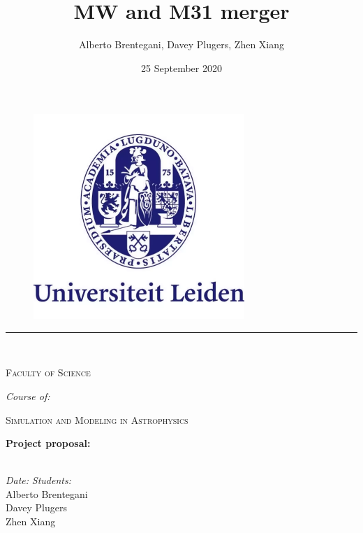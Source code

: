 \documentclass[11pt, english]{article}
\title{MW and M31 merger}
\author{Alberto Brentegani, Davey Plugers, Zhen Xiang}
\date{25 September 2020}
\begin{document}
\begin{titlepage}
\makeatletter
\begin{center}

\vspace*{-1in}
\begin{figure}[htb]
    \centering
    \includegraphics[width=8cm]{lu_logo.png}
\end{figure}

\vspace{-25pt}
\rule{125mm}{0.1mm} \\
\vspace{5pt}
\begin{Large}
    \textsc{Faculty of Science}\\
\end{Large}
\vspace{5pt}
\textit{Course of:}\\

\begin{Large}
    \textsc{Simulation and Modeling in Astrophysics}\\
\end{Large}
\vspace{30pt}

\begin{LARGE}
    \textbf{Project proposal:} \\
    \textbf{\@title} \\
\end{LARGE}
\vfill

\begin{normalsize}
	\begin{flushleft}
	  \textit{Date:} \hfill \textit{Students:}\\
	  \vspace{1pt}
	  \@date \hfill Alberto Brentegani\\
	  \hfill Davey Plugers\\
	  \hfill Zhen Xiang\\
	  \vspace{10pt}
	\end{flushleft}
\end{normalsize}
\vspace{20pt}


\end{center}
\end{titlepage}
\end{document}
